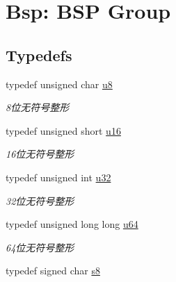 \hypertarget{group___b_s_p}{\section{\-Bsp\-: \-B\-S\-P \-Group}
\label{group___b_s_p}
}
\subsection*{\-Typedefs}
\begin{DoxyCompactItemize}
\item 
\hypertarget{group___b_s_p_gaed742c436da53c1080638ce6ef7d13de}{typedef unsigned char \hyperlink{group___b_s_p_gaed742c436da53c1080638ce6ef7d13de}{u8}}\label{group___b_s_p_gaed742c436da53c1080638ce6ef7d13de}

\begin{DoxyCompactList}\small\item\em 8位无符号整形 \end{DoxyCompactList}\item 
\hypertarget{group___b_s_p_ga9e6c91d77e24643b888dbd1a1a590054}{typedef unsigned short \hyperlink{group___b_s_p_ga9e6c91d77e24643b888dbd1a1a590054}{u16}}\label{group___b_s_p_ga9e6c91d77e24643b888dbd1a1a590054}

\begin{DoxyCompactList}\small\item\em 16位无符号整形 \end{DoxyCompactList}\item 
\hypertarget{group___b_s_p_ga10e94b422ef0c20dcdec20d31a1f5049}{typedef unsigned int \hyperlink{group___b_s_p_ga10e94b422ef0c20dcdec20d31a1f5049}{u32}}\label{group___b_s_p_ga10e94b422ef0c20dcdec20d31a1f5049}

\begin{DoxyCompactList}\small\item\em 32位无符号整形 \end{DoxyCompactList}\item 
\hypertarget{group___b_s_p_gad758b7a5c3f18ed79d2fcd23d9f16357}{typedef unsigned long long \hyperlink{group___b_s_p_gad758b7a5c3f18ed79d2fcd23d9f16357}{u64}}\label{group___b_s_p_gad758b7a5c3f18ed79d2fcd23d9f16357}

\begin{DoxyCompactList}\small\item\em 64位无符号整形 \end{DoxyCompactList}\item 
\hypertarget{group___b_s_p_ga151f780fb455885061d3b77ec1c90c03}{typedef signed char \hyperlink{group___b_s_p_ga151f780fb455885061d3b77ec1c90c03}{s8}}\label{group___b_s_p_ga151f780fb455885061d3b77ec1c90c03}


\end{DoxyCompactItemize}

